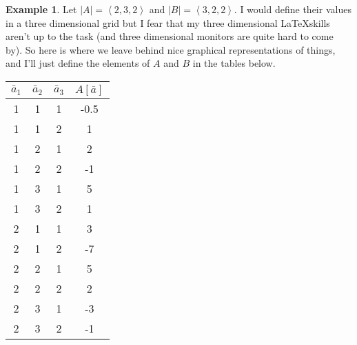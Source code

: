 \documentclass[12pt]{book}
\theoremstyle{plain}
\theoremstyle{definition}
\newtheorem{example}{Example}[chapter]
\theoremstyle{ppart}
\theoremstyle{case}
\theoremstyle{solution}
\begin{document}
\newpage
\begin{example}
Let $|A| = \left<2, 3, 2\right>$ and $|B| = \left<3, 2, 2\right>$. I would
define their values in a three dimensional grid but I fear that my three dimensional
\LaTeX skills aren't up to the task (and three dimensional monitors are quite hard to
come by). So here is where we leave behind nice graphical representations of
things, and I'll just define the elements of $A$ and $B$ in the tables below.
\begin{table}[h!]
\begin{center}
\begin{tabular}{c c c | c}
$\bar{a}_1$ & $\bar{a}_2$ & $\bar{a}_3$ & $A[\bar{a}]$ \\
\hline
1           & 1           & 1           & -0.5         \\
1           & 1           & 2           & 1            \\
1           & 2           & 1           & 2            \\
1           & 2           & 2           & -1           \\
1           & 3           & 1           & 5            \\
1           & 3           & 2           & 1            \\
2           & 1           & 1           & 3            \\
2           & 1           & 2           & -7           \\
2           & 2           & 1           & 5            \\
2           & 2           & 2           & 2            \\
2           & 3           & 1           & -3           \\
2           & 3           & 2           & -1
\end{tabular}
\end{center}
\end{table}


\end{example}
\end{document}
